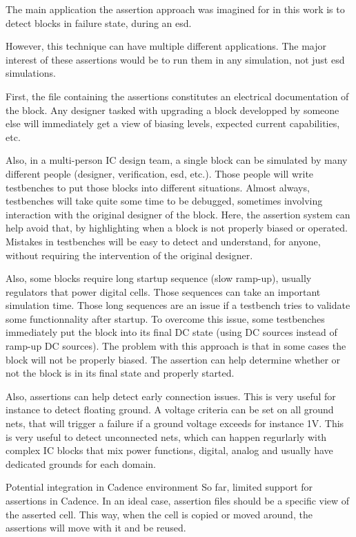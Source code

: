 The main application the assertion approach was imagined for in this work is to detect blocks in failure state,
during an \gls{esd}.

However, this technique can have multiple different applications.
The major interest of these assertions would be to run them in any simulation, not just \gls{esd} simulations.

First, the file containing the assertions constitutes an electrical documentation of the block.
Any designer tasked with upgrading a block developped by someone else will immediately get a view of biasing levels,
expected current capabilities, etc.

Also, in a multi-person IC design team, a single block can be simulated by many different people (designer, verification, esd, etc.).
Those people will write testbenches to put those blocks into different situations.
Almost always, testbenches will take quite some time to be debugged, sometimes involving interaction with the original designer of the block.
Here, the assertion system can help avoid that, by highlighting when a block is not properly biased or operated.
Mistakes in testbenches will be easy to detect and understand, for anyone, without requiring the intervention of the original designer.

Also, some blocks require long startup sequence (slow ramp-up), usually regulators that power digital cells.
Those sequences can take an important simulation time.
Those long sequences are an issue if a testbench tries to validate some functionnality after startup.
To overcome this issue, some testbenches immediately put the block into its final DC state (using DC sources instead of ramp-up DC sources).
The problem with this approach is that in some cases the block will not be properly biased.
The assertion can help determine whether or not the block is in its final state and properly started.

Also, assertions can help detect early connection issues.
This is very useful for instance to detect floating ground.
A voltage criteria can be set on all ground nets, that will trigger a failure if a ground voltage exceeds for instance 1V.
This is very useful to detect unconnected nets, which can happen regurlarly with complex IC blocks that mix power functions, digital, analog
and usually have dedicated grounds for each domain.

Potential integration in Cadence environment
So far, limited support for assertions in Cadence.
In an ideal case, assertion files should be a specific view of the asserted cell.
This way, when the cell is copied or moved around, the assertions will move with it and be reused.

